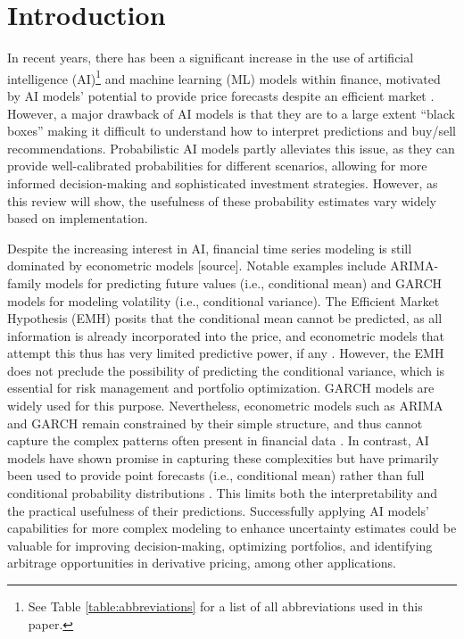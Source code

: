 \section{Introduction}
\label{sec:introduction}
In recent years, there has been a significant increase in the use of artificial intelligence (AI)\footnote{See Table \ref{table:abbreviations} for a list of all abbreviations used in this paper.
} and machine learning (ML) models within finance, motivated by AI models' potential to provide price forecasts despite an efficient market \parencite{sezer2020financial}. However, a major drawback of AI models is that they are to a large extent ``black boxes'' making it difficult to understand how to interpret predictions and buy/sell recommendations. Probabilistic AI models partly alleviates this issue, as they can provide well-calibrated probabilities for different scenarios, allowing for more informed decision-making and sophisticated investment strategies. However, as this review will show, the usefulness of these probability estimates vary widely based on implementation.

Despite the increasing interest in AI, financial time series modeling is still dominated by econometric models [source]. Notable examples include ARIMA-family models for predicting future values (i.e., conditional mean) and GARCH models for modeling volatility (i.e., conditional variance). The Efficient Market Hypothesis (EMH) posits that the conditional mean cannot be predicted, as all information is already incorporated into the price, and econometric models that attempt this thus has very limited predictive power, if any \parencite{Campbell2007}. However, the EMH does not preclude the possibility of predicting the conditional variance, which is essential for risk management and portfolio optimization. GARCH models are widely used for this purpose. Nevertheless, econometric models such as ARIMA and GARCH remain constrained by their simple structure, and thus cannot capture the complex patterns often present in financial data \parencite{sezer2020financial}. In contrast, AI models have shown promise in capturing these complexities but have primarily been used to provide point forecasts (i.e., conditional mean) rather than full conditional probability distributions \parencite{Tang2022Survey}. This limits both the interpretability and the practical usefulness of their predictions. Successfully applying AI models' capabilities for more complex modeling to enhance uncertainty estimates could be valuable for improving decision-making, optimizing portfolios, and identifying arbitrage opportunities in derivative pricing, among other applications.

